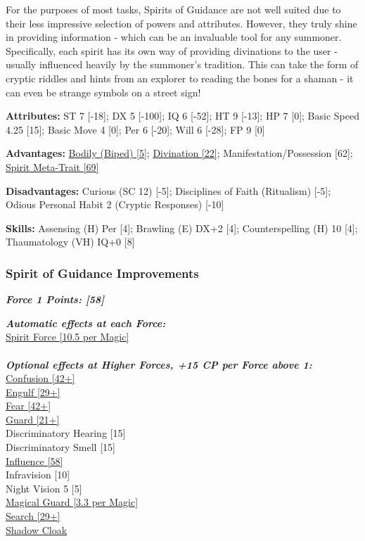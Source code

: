 \begin{multicols}{3}
	For the purposes of most tasks, Spirits of Guidance are not well suited due to their less impressive selection of powers and attributes. However, they truly shine in providing information - which can be an invaluable tool for any summoner. Specifically, each spirit has its own way of providing divinations to the user - usually influenced heavily by the summoner's tradition. This can take the form of cryptic riddles and hints from an explorer to reading the bones for a shaman - it can even be strange symbols on a street sign!
	
	\textbf{Attributes:}
	ST 7 [-18]; DX 5 [-100]; IQ 6 [-52]; HT 9 [-13]; HP 7 [0]; Basic Speed 4.25 [15]; Basic Move 4 [0]; Per 6 [-20]; Will 6 [-28]; FP 9 [0]
	
	\textbf{Advantages:}
	\hyperref[bodily]{Bodily (Biped) [5]}; \hyperref[divination]{Divination [22]}; Manifestation/Possession [62]; \hyperref[spirit_meta_trait]{Spirit Meta-Trait [69]}
	
	\textbf{Disadvantages:}
	Curious (SC 12) [-5]; Disciplines of Faith (Ritualism) [-5]; Odious Personal Habit 2 (Cryptic Responses) [-10]
	
	\textbf{Skills:}
	Assensing (H) Per [4]; Brawling (E) DX+2 [4]; Counterspelling (H) 10 [4]; Thaumatology (VH) IQ+0 [8]
	
	\subsubsection*{Spirit of Guidance Improvements}
	
	\textbf{\textit{Force 1 Points: [58]}}
	
	\textbf{\textit{Automatic effects at each Force:\\}}
	\hyperref[spirit_force]{Spirit Force [10.5 per Magic]}\\\\
	
	\textbf{\textit{Optional effects at Higher Forces, +15 CP per Force above 1:\\}}
	\hyperref[confusion]{Confusion [42+]}\\
	\hyperref[engulf]{Engulf [29+]}\\
	\hyperref[fear]{Fear [42+]}\\
	\hyperref[guard]{Guard [21+]}\\
	Discriminatory Hearing [15] \\
	Discriminatory Smell [15] \\
	\hyperref[influence]{Influence [58]}\\
	Infravision [10] \\
	Night Vision 5 [5] \\
	\hyperref[magical_guard]{Magical Guard [3.3 per Magic]}\\
	\hyperref[search]{Search [29+]}\\
	\hyperref[shadow_cloak]{Shadow Cloak}\\
	

\end{multicols}
